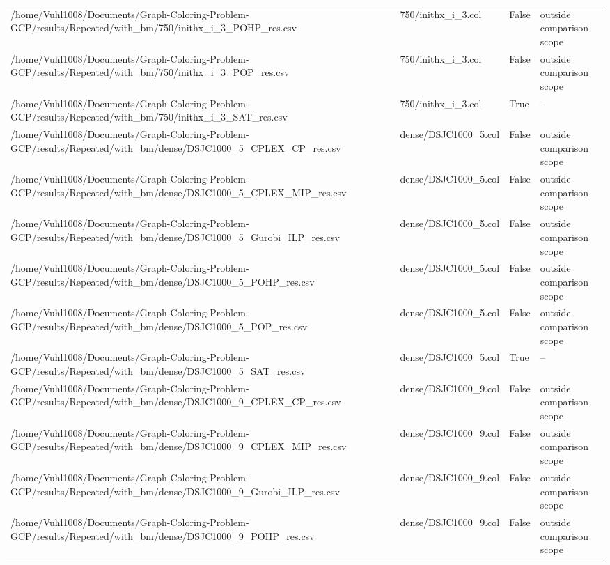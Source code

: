 \begin{table}[htbp]
\begin{tabular}{llll}
/home/Vuhl1008/Documents/Graph-Coloring-Problem-GCP/results/Repeated/with\_bm/750/inithx\_i\_3\_POHP\_res.csv & 750/inithx\_i\_3.col & False & outside comparison scope \\
/home/Vuhl1008/Documents/Graph-Coloring-Problem-GCP/results/Repeated/with\_bm/750/inithx\_i\_3\_POP\_res.csv & 750/inithx\_i\_3.col & False & outside comparison scope \\
/home/Vuhl1008/Documents/Graph-Coloring-Problem-GCP/results/Repeated/with\_bm/750/inithx\_i\_3\_SAT\_res.csv & 750/inithx\_i\_3.col & True & -- \\
/home/Vuhl1008/Documents/Graph-Coloring-Problem-GCP/results/Repeated/with\_bm/dense/DSJC1000\_5\_CPLEX\_CP\_res.csv & dense/DSJC1000\_5.col & False & outside comparison scope \\
/home/Vuhl1008/Documents/Graph-Coloring-Problem-GCP/results/Repeated/with\_bm/dense/DSJC1000\_5\_CPLEX\_MIP\_res.csv & dense/DSJC1000\_5.col & False & outside comparison scope \\
/home/Vuhl1008/Documents/Graph-Coloring-Problem-GCP/results/Repeated/with\_bm/dense/DSJC1000\_5\_Gurobi\_ILP\_res.csv & dense/DSJC1000\_5.col & False & outside comparison scope \\
/home/Vuhl1008/Documents/Graph-Coloring-Problem-GCP/results/Repeated/with\_bm/dense/DSJC1000\_5\_POHP\_res.csv & dense/DSJC1000\_5.col & False & outside comparison scope \\
/home/Vuhl1008/Documents/Graph-Coloring-Problem-GCP/results/Repeated/with\_bm/dense/DSJC1000\_5\_POP\_res.csv & dense/DSJC1000\_5.col & False & outside comparison scope \\
/home/Vuhl1008/Documents/Graph-Coloring-Problem-GCP/results/Repeated/with\_bm/dense/DSJC1000\_5\_SAT\_res.csv & dense/DSJC1000\_5.col & True & -- \\
/home/Vuhl1008/Documents/Graph-Coloring-Problem-GCP/results/Repeated/with\_bm/dense/DSJC1000\_9\_CPLEX\_CP\_res.csv & dense/DSJC1000\_9.col & False & outside comparison scope \\
/home/Vuhl1008/Documents/Graph-Coloring-Problem-GCP/results/Repeated/with\_bm/dense/DSJC1000\_9\_CPLEX\_MIP\_res.csv & dense/DSJC1000\_9.col & False & outside comparison scope \\
/home/Vuhl1008/Documents/Graph-Coloring-Problem-GCP/results/Repeated/with\_bm/dense/DSJC1000\_9\_Gurobi\_ILP\_res.csv & dense/DSJC1000\_9.col & False & outside comparison scope \\
/home/Vuhl1008/Documents/Graph-Coloring-Problem-GCP/results/Repeated/with\_bm/dense/DSJC1000\_9\_POHP\_res.csv & dense/DSJC1000\_9.col & False & outside comparison scope \\

\end{tabular}
\end{table}
